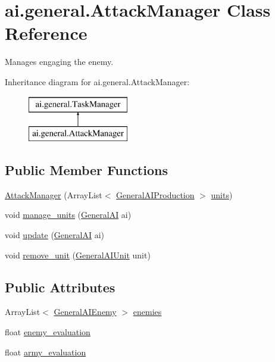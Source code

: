 \hypertarget{classai_1_1general_1_1_attack_manager}{
\section{ai.general.AttackManager Class Reference}
\label{classai_1_1general_1_1_attack_manager}
}


Manages engaging the enemy.  


Inheritance diagram for ai.general.AttackManager:\begin{figure}[H]
\begin{center}
\leavevmode
\includegraphics[height=2.000000cm]{classai_1_1general_1_1_attack_manager}
\end{center}
\end{figure}
\subsection*{Public Member Functions}
\begin{DoxyCompactItemize}
\item 
\hyperlink{classai_1_1general_1_1_attack_manager_af228fbbf4c0cfbbe61c7862e04497790}{AttackManager} (ArrayList$<$ \hyperlink{classai_1_1general_1_1_general_a_i_production}{GeneralAIProduction} $>$ \hyperlink{classai_1_1general_1_1_task_manager_af1f1456711a8fae38008a1f257499a40}{units})
\item 
void \hyperlink{classai_1_1general_1_1_attack_manager_ac58488b9d0607214f5f7c7750446e107}{manage\_\-units} (\hyperlink{classai_1_1general_1_1_general_a_i}{GeneralAI} ai)
\item 
void \hyperlink{classai_1_1general_1_1_attack_manager_a6776ff3d2b303c7f9301b94afb646b00}{update} (\hyperlink{classai_1_1general_1_1_general_a_i}{GeneralAI} ai)
\item 
void \hyperlink{classai_1_1general_1_1_attack_manager_a42765ba36921d2b25462bb3d1fe9f7bd}{remove\_\-unit} (\hyperlink{classai_1_1general_1_1_general_a_i_unit}{GeneralAIUnit} unit)
\end{DoxyCompactItemize}
\subsection*{Public Attributes}
\begin{DoxyCompactItemize}
\item 
ArrayList$<$ \hyperlink{classai_1_1general_1_1_general_a_i_enemy}{GeneralAIEnemy} $>$ \hyperlink{classai_1_1general_1_1_attack_manager_a53d8def4a0c0dfc670b1b6b48dc2f672}{enemies}
\item 
float \hyperlink{classai_1_1general_1_1_attack_manager_aab9e1ce511b6c0764d792ab3c2103785}{enemy\_\-evaluation}
\item 
float \hyperlink{classai_1_1general_1_1_attack_manager_ad41874870bb278b128ce86d454b88335}{army\_\-evaluation}
\end{DoxyCompactItemize}
